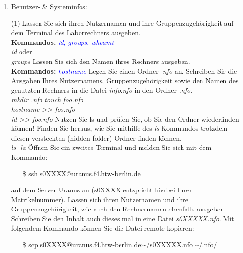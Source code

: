 \documentclass[paper=a4,fontsize=11pt]{scrartcl}%
\numberwithin{equation}{section}
\begin{document}
{\begin{enumerate}
\begin{tasks}
        \end{tasks}
        \footnote{.md steht für Markdown, welches ein Format für Textdateien ist, ähnlich wie .pdf oder .doc-Dateien.}
        \footnote{\url{https://github.com/retext-project}}
         \footnote{Sie können auch mit vi, vim oder emacs arbeiten!}
  \item Benutzer- \& Systeminfos:
        \begin{tasks}(1)       
          \task Lassen Sie sich ihren Nutzernamen und ihre Gruppenzugehörigkeit auf dem Terminal des Laborrechners ausgeben. \\
          \textbf{Kommandos:} \textcolor{blue}{\emph{id}, \emph{groups}, \emph{whoami}}\\
          \textit{id} oder\\
          \textit{groups}
          \task Lassen Sie sich den Namen ihres Rechners ausgeben.\\
          \textbf{Kommandos:} \textcolor{blue}{\emph{hostname}}
          \task Legen Sie einen Ordner \emph{.nfo} an. Schreiben Sie die Ausgaben Ihres Nutzernamens, Gruppenzugehörigkeit sowie den Namen des genutzten Rechners in die Datei \emph{info.nfo} in den Ordner \emph{.nfo}.\\
          \textit{mkdir .nfo}
          \textit{touch foo.nfo}\\
          \textit{hostname >> foo.nfo}\\
          \textit{id >> foo.nfo}
          \task Nutzen Sie ls und prüfen Sie, ob Sie den Ordner wiederfinden können! Finden Sie heraus, wie Sie mithilfe des \emph{ls} Kommandos trotzdem diesen versteckten (hidden folder) Ordner finden können. \\
          \textit{ls -la}  
          \task Öffnen Sie ein zweites Terminal und melden Sie sich mit dem Kommando:
          \begin{itemize}
          \item[\$]ssh s0XXXX@uranus.f4.htw-berlin.de
          \end{itemize}
           auf dem Server Uranus an (s0XXXX entspricht hierbei Ihrer Matrikelnummer).
           Lassen sich ihren Nutzernamen und ihre Gruppenzugehörigkeit, wie auch den Rechnernamen ebenfalls ausgeben. Schreiben Sie den Inhalt auch dieses mal in eine Datei \emph{s0XXXXX.nfo}. Mit folgendem Kommando können Sie die Datei remote kopieren: 
           \begin{itemize}
          \item[\$]scp s0XXXX@uranus.f4.htw-berlin.de:\textasciitilde /s0XXXXX.nfo \textasciitilde/.nfo/

\end{itemize}
\end{tasks}
\end{enumerate}}
\end{document}
